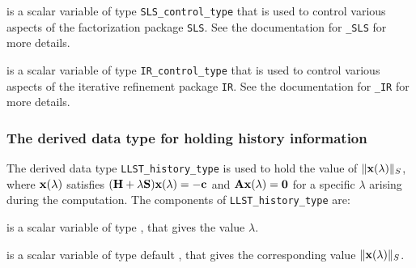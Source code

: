 \documentclass{galahad}
\newcommand{\packagename}{LLST}
\begin{document}
\begin{description}
 is a scalar variable of type
{\tt SLS\_control\_type} that is used to control various aspects of the
factorization package {\tt SLS}. See the documentation for
{\tt \libraryname\_SLS} for more details.

 is a scalar variable of type
{\tt IR\_control\_type} that is used to control various aspects of the
iterative refinement package {\tt IR}. See the documentation for
{\tt \libraryname\_IR} for more details.

\end{description}


\subsubsection{The derived data type for holding history
 information}\label{typehist}
The derived data type
{\tt \packagename\_history\_type}
is used to hold the value of $\|{\mathbf{x}}(\lambda)\|_S$, where
${\mathbf{x}}(\lambda)$ satisfies
$({\mathbf{H}} + \lambda {\mathbf{S}}){\mathbf{x}}(\lambda) = - {\mathbf{c}}$ and ${\mathbf{A}}{\mathbf{x}}(\lambda) = {\mathbf{0}}$
for a specific $\lambda$ arising during the computation.
The components of
{\tt \packagename\_history\_type}
are:
\begin{description}
 is a scalar variable of type \realdp, that gives
 the value $\lambda$.

 is a scalar variable of type default \real, that gives
 the corresponding value $\|{\mathbf{x}}(\lambda)\|_S$.

\end{description}

\end{document}
